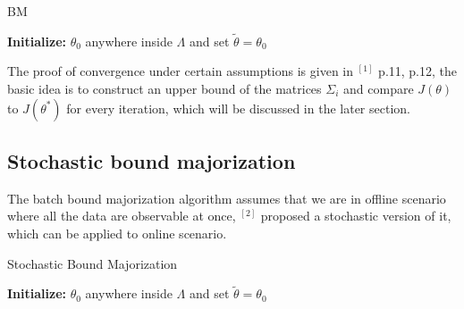 \documentclass{article}
\begin{document}
 \begin{algorithm}[H]
  \caption{BM}
  \textbf{Initialize:} $\theta_0$ anywhere inside $\Lambda$ and set $\tilde{\theta} = \theta_0$  \;    
    
  \KwOut{$\hat{\theta} = \tilde{\theta}$}
  \label{algorithm2}
  \end{algorithm}

The proof of convergence under certain assumptions is given in $^{[1]}$ p.11, p.12, the basic idea is to construct an upper bound of the matrices $\Sigma_i$ and compare $J(\theta)$ to $J(\theta^*)$ for every iteration, which will be discussed in
the later section.

\subsection{Stochastic bound majorization}

The batch bound majorization algorithm assumes that we are in offline scenario where all the data are observable at once, $^{[2]}$ proposed a stochastic version of it,
which can be applied to online scenario.
\begin{algorithm}[H]
  \caption{Stochastic Bound Majorization}
  \textbf{Initialize:} $\theta_0$ anywhere inside $\Lambda$ and set $\tilde{\theta} = \theta_0$  \;    
    
  \KwOut{$\hat{\theta} = \tilde{\theta}$}
  \label{algorithm3}
  \end{algorithm}
\end{document}
